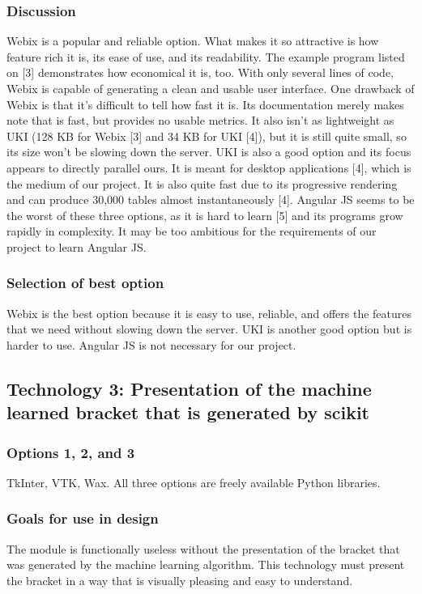 \documentclass[journal,onecolumn]{IEEEtran}
\begin{document}
\subsubsection{Discussion}
Webix is a popular and reliable option. What makes it so attractive is how feature rich it is, its ease of use, and its readability. The example
program listed on [3] demonstrates how economical it is, too. With only several lines of code, Webix is capable of generating a clean and usable
user interface. One drawback of Webix is that it's difficult to tell how fast it is. Its documentation merely makes note that is fast, but provides no
usable metrics. It also isn't as lightweight as UKI (128 KB for Webix [3] and 34 KB for UKI [4]), 
but it is still quite small, so its size won't be slowing down the server. UKI is also a good option and its focus appears to directly parallel ours. 
It is meant for desktop applications [4], which is the medium of our project. It is also quite fast due to its progressive rendering and can
produce 30,000 tables almost instantaneously [4]. Angular JS seems to be the worst of these three options, as it is hard to learn [5] and 
 its programs grow rapidly in complexity. It may be too ambitious for the requirements of our project to learn Angular JS.
\subsubsection{Selection of best option}
Webix is the best option because it is easy to use, reliable, and offers the features that we need without slowing down the server. UKI is another good option but is harder to use. Angular JS is not necessary for our project.

\subsection{Technology 3: Presentation of the machine learned bracket that is generated by scikit}

\subsubsection{Options 1, 2, and 3}
TkInter, VTK, Wax. All three options are freely available Python libraries. 
\subsubsection{Goals for use in design}
The module is functionally useless without the presentation of the bracket that was generated by the machine learning algorithm. This technology must present the bracket in a way that is visually pleasing and easy to understand. 
\end{document}
